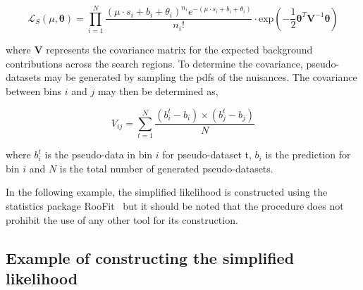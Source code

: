 \begin{equation}
\mathcal{L}_{S}(\mu, \boldsymbol{\theta}) =  \prod_{i=1}^{N} \dfrac{(\mu \cdot s_{i}+b_{i}+\theta_{i})^{n_{i}} e^{-(\mu \cdot s_{i}+b_{i}+\theta_{i})} }{n_{i}!} \cdot  
\mathrm{exp}\left(-\dfrac{1}{2} \boldsymbol{\theta}^{T}\mathrm{\mathbf{V}}^{-1}\boldsymbol{\theta} \right)
\label{eq:full-likelihood}
\end{equation}

where $\mathrm{\mathbf{V}}$ represents the covariance matrix for the expected background contributions across the search regions. To determine the covariance, 
pseudo-datasets may be generated by sampling the pdfs of the nuisances. The covariance between bins $i$ and $j$ may then be determined as,

\begin{equation}
V_{ij}=\sum^N_{t=1}{\frac{(b^t_i-b_{i})\times(b^t_j-b_{j})}{N}}
\label{eq-cov}
\end{equation}

where $b^t_i$ is the pseudo-data in bin $i$ for pseudo-dataset t, 
$b_i$ is the prediction for bin $i$ and $N$ is the total number of generated pseudo-datasets.

In the following example, the simplified likelihood is constructed using the statistics package {\sc RooFit}~\cite{roofit} but it should be noted that 
the procedure does not prohibit the use of any other tool for its construction. 

\subsection{Example of constructing the simplified likelihood}
\label{sec:sl-toy}

